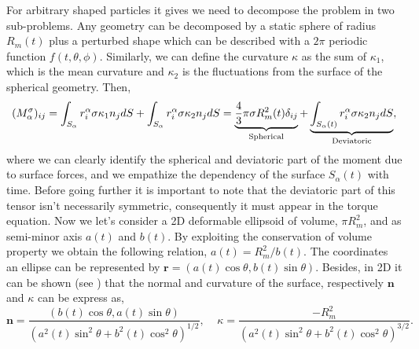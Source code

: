 For arbitrary shaped particles it gives we need to decompose the problem in two sub-problems. 
Any geometry can be decomposed by a static sphere of radius $R_m(t)$ plus a perturbed shape which can be described with a $2\pi$ periodic function $f(t,\theta,\phi)$. 
Similarly, we can define the curvature $\kappa$ as the sum of $\kappa_1$, which is the mean curvature and $\kappa_2$ is the fluctuations from the surface of the spherical geometry. Then,
\begin{equation}
    (M^\sigma_\alpha)_{ij}
    =\int_{S_\alpha}r^\alpha_i \sigma \kappa_1 n_j dS
    +\int_{S_\alpha}r^\alpha_i \sigma \kappa_2 n_j dS\\
    = \underbrace{\frac{4}{3} \pi \sigma R_m^2(t)  \delta_{ij}}_{\text{Spherical}}
    +
    \underbrace{\int_{S_\alpha(t)}r^\alpha_i \sigma \kappa_2 n_j dS}_{\text{Deviatoric}},
\end{equation}
where we can clearly identify the spherical and deviatoric part of the moment due to surface forces,
and we empathize the dependency of the surface $S_\alpha(t)$ with time. 
Before going further it is important to note that the deviatoric part of this tensor isn't necessarily symmetric, consequently it must appear in the torque equation.
Now we let's consider a 2D deformable ellipsoid of volume, $\pi R_m^2$, and as semi-minor axis $a(t)$ and $b(t)$. 
By exploiting the conservation of volume property we obtain the following relation, 
$a(t) = R^2_m/b(t)$. 
The coordinates an ellipse can be represented by $\bm{r} = (a(t) \cos\theta, b(t)\sin\theta)$. 
Besides, in 2D it can be shown (see \citet{tryggvason2011direct}) that the normal and curvature of the surface, respectively $\bm{n}$ and $\kappa$ can be express as,
\begin{equation}
    \bm{n} 
    = \frac{\left(b(t) \cos\theta, a(t)\sin\theta\right)}{(a^2(t)\sin^2\theta+b^2(t)\cos^2\theta)^{1/2}},
    \;\;\;\;
    \kappa
    = \frac{- R_m^2}{(a^2(t)\sin^2\theta+b^2(t)\cos^2\theta)^{3/2}}.
\end{equation}


